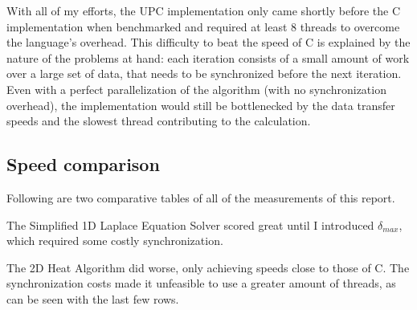 \documentclass[12pt]{article}
\begin{document}
With all of my efforts, the UPC implementation only came shortly before the C implementation when benchmarked and required at least 8 threads to overcome the language's overhead.
This difficulty to beat the speed of C is explained by the nature of the problems at hand: each iteration consists of a small amount of work over a large set of data, that needs to be synchronized before the next iteration.
Even with a perfect parallelization of the algorithm (with no synchronization overhead), the implementation would still be bottlenecked by the data transfer speeds and the slowest thread contributing to the calculation.

\subsection{Speed comparison}

Following are two comparative tables of all of the measurements of this report.

The Simplified 1D Laplace Equation Solver scored great until I introduced $\delta_{max}$, which required some costly synchronization.

The 2D Heat Algorithm did worse, only achieving speeds close to those of C.
The synchronization costs made it unfeasible to use a greater amount of threads, as can be seen with the last few rows.
\end{document}
